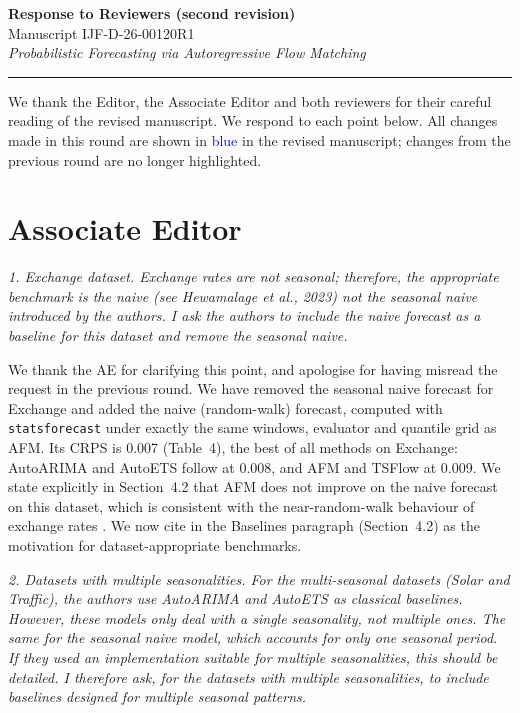 \documentclass[11pt]{article}
\newcommand{\reviewertext}[1]{%
  \begin{reviewerquote}
    {\color{reviewercolor}\itshape #1}
  \end{reviewerquote}%
}
\newcommand{\authorresponse}[1]{%
    #1\par\medskip
}
\begin{document}
\begin{center}
  {\LARGE \textbf{Response to Reviewers (second revision)}}\\[6pt]
  {\large Manuscript IJF-D-26-00120R1}\\[4pt]
  {\large \textit{Probabilistic Forecasting via Autoregressive Flow Matching}}\\[4pt]
  \rule{\linewidth}{0.4pt}
\end{center}

We thank the Editor, the Associate Editor and both reviewers for their careful reading of the revised manuscript. We respond to each point below. All changes made in this round are shown in \textcolor{blue}{blue} in the revised manuscript; changes from the previous round are no longer highlighted.

\section{Associate Editor}

\reviewertext{%
1. Exchange dataset. Exchange rates are not seasonal; therefore, the appropriate benchmark is the naive (see Hewamalage et al., 2023) not the seasonal naive introduced by the authors. I ask the authors to include the naive forecast as a baseline for this dataset and remove the seasonal naive.
}

\authorresponse{%
We thank the AE for clarifying this point, and apologise for having misread the request in the previous round. We have removed the seasonal naive forecast for Exchange and added the naive (random-walk) forecast, computed with \texttt{statsforecast} under exactly the same windows, evaluator and quantile grid as AFM. Its CRPS is 0.007 (Table~4), the best of all methods on Exchange: AutoARIMA and AutoETS follow at 0.008, and AFM and TSFlow at 0.009. We state explicitly in Section~4.2 that AFM does not improve on the naive forecast on this dataset, which is consistent with the near-random-walk behaviour of exchange rates \citep{meese1983empirical}.
We now cite \citet{hewamalage2023forecast} in the Baselines paragraph (Section~4.2) as the motivation for dataset-appropriate benchmarks.
}

\reviewertext{%
2. Datasets with multiple seasonalities. For the multi-seasonal datasets (Solar and Traffic), the authors use AutoARIMA and AutoETS as classical baselines. However, these models only deal with a single seasonality, not multiple ones. The same for the seasonal naive model, which accounts for only one seasonal period. If they used an implementation suitable for multiple seasonalities, this should be detailed. I therefore ask, for the datasets with multiple seasonalities, to include baselines designed for multiple seasonal patterns.
}
\end{document}
